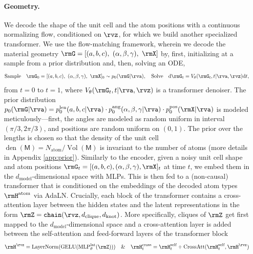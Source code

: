 \documentclass{article}
\theoremstyle{plain}
\theoremstyle{definition}
\theoremstyle{remark}
\begin{document}
\paragraph{Geometry.} We decode the shape of the unit cell and the atom positions with a continuous normalizing flow, conditioned on $\rvz$, for which we build another specialized transformer.
We use the flow-matching framework, wherein we decode the material geometry $\rmG = [(a,b,c), \ (\alpha, \beta, \gamma), \ \rmX]$ by, first, initializing at a sample from a prior distribution and, then, solving an ODE,
\begin{align}
    \text{Sample} \quad \rmG_{0} = [(a,b,c), \ (\alpha, \beta, \gamma), \ \rmX]_{0} \sim p_{0}(\rmG | \rva),\quad 
    \text{Solve} \quad 
    \text{d}\rmG_{t} = V_{\theta}(\rmG_{t}, t | \rva, \rvz)\text{d}t,  \nonumber
\end{align}
from $t=0$ to $t=1$,
where $V_{\theta}(\rmG_t, t | \rva, \rvz)$ is a transformer denoiser.
The prior distribution $p_{0}(\rmG|\rva)=p^{\text{len}}_{0}(a,b,c|\rva)\cdot p^{\text{ang}}_{0}(\alpha, \beta, \gamma|\rva)\cdot p^{\text{pos}}_{0}(\rmX|\rva)$ is modeled meticulously---first, the angles are modeled as random uniform in interval $(\pi/3, 2\pi/3)$, and positions are random uniform on $(0, 1)$.
The prior over the lengths is chosen so that the density of the unit cell $\operatorname{den}(\mathsf{M})=N_{\text{atom}}/\operatorname{Vol}(\mathsf{M})$ is invariant to the number of atoms (more details in Appendix \ref{app:prior}).
Similarly to the encoder, given a noisy unit cell shape and atom positions $\rmG_{t} = [(a,b,c), (\alpha, \beta, \gamma), \rmX]_{t}$ at time $t$, we embed them in the $d_{\text{model}}$-dimensional space with MLPs. 
This is then fed to a (non-causal) transformer that is conditioned on the embeddings of the decoded atom types $\rmH^{\text{atom}}$ via AdaLN. 
Crucially, each block of the transformer contains a cross-attention layer \citep{vaswani2017attention} between the hidden states and the latent representations in the form $\rmZ=\texttt{chain}(\rvz, d_{\text{clique}}, d_{\text{knot}})$. 
More specifically, cliques of $\rmZ$ get first mapped to the $d_{\text{model}}$-dimensional space
and a cross-attention layer is added between the self-attention and feed-forward layers of the transformer block
\begin{align}
    \rmH^{\rvz} = \operatorname{LayerNorm}(\operatorname{GELU}(\operatorname{MLP}^{\text{lat}}_{\theta}(\rmZ)))
    \quad \& \quad 
    \rmH^{\text{cross}}_{t} = \rmH^{\text{self}}_{t} + \operatorname{CrossAtt}(\rmH^{\text{self}}_{t}, \rmH^{\rvz})\nonumber
\end{align}
\end{document}
